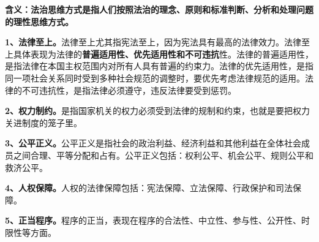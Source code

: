 \textbf{{\textbf{含义：}法治思维方式是指人们按照法治的理念、原则和标准判断、分析和处理问题的理性思维方式{。}\\
}}

{\textbf{{1、法律至上。}}}{}{法律至上尤其指宪法至上，因为宪法具有最高的法律效力。法律至上具体表现为法律的}{\textbf{{普遍适用性、优先适用性和不可违抗}}{性}}{。}{法律的普遍适用性}{，是}{指法律在本国主权范围内对所有人具有普遍的约束力。}{法律的优先适用}{性}{，}{是指同一项社会关系同时受到多种社会规范的调整时，要优先考虑法律规范的适用}{。}{法律的不可违抗性}{，}{是指法律必须遵守，违反法律要受到惩罚}{。}

{\textbf{{2、权力制约。}}}{}{是指国家机关的权力必须受到法律的规制和约束，也就是要把权力关进制度的笼子里。}

\textbf{{3、公平正义。}}{公平正义是指社会的政治利益、经济利益和其他利益在全体社会成员之间合理、平等分配和占有。公平正义包括：权利公平、机会公平、规则公平和救济公平。}

{\textbf{4、人权保障。}}{人权的法律保障包括：宪法保障、立法保障、行政保护和司法保障。}

\textbf{{5、正当程序。}}{程序的正当，表现在程序的合法性、中立性、参与性、公开性、时限性等方面。}
